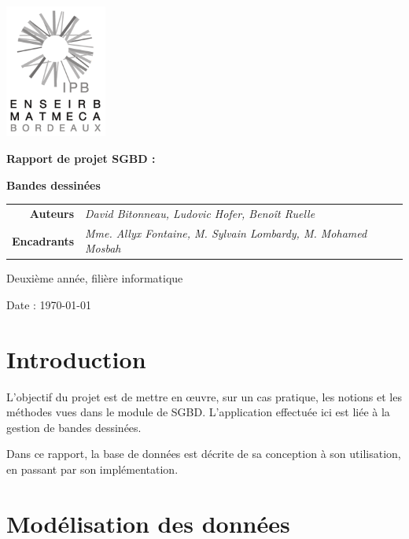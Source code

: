 \documentclass[12pt]{article}
\begin{document}
\thispagestyle{empty}
\noindent\includegraphics[width=0.25\textwidth]{enseirb-matmeca}


\begin{center}
	\Huge{\textbf{Rapport de projet SGBD :}}

	\Huge{\textbf{Bandes dessinées}}
\end{center}


\begin{tabular}{r@{:~}l}
	\textbf{Auteurs} & \textit{David Bitonneau, Ludovic Hofer, Benoît Ruelle}\\
 \textbf{Encadrants} & \textit{Mme. Allyx Fontaine, M. Sylvain Lombardy,
M. Mohamed Mosbah}\\
\end{tabular}


\begin{center}Deuxième année, filière informatique

	Date : \today
\end{center}

\newpage

\section{Introduction}

L'objectif du projet est de mettre en œuvre, sur un cas pratique, les notions
et les méthodes vues dans le module de SGBD. L'application effectuée ici est
liée à la gestion de bandes dessinées.

Dans ce rapport, la base de données est décrite de sa conception à son
utilisation, en passant par son implémentation. 

\section{Modélisation des données}
\end{document}
